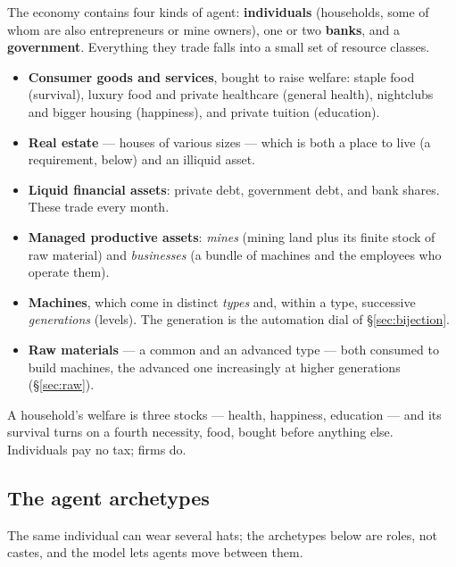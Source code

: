 \documentclass[11pt]{article}
\begin{document}
The economy contains four kinds of agent: \textbf{individuals} (households, some
of whom are also entrepreneurs or mine owners), one or two \textbf{banks}, and
a \textbf{government}. Everything they trade falls into a small set of
resource classes.

\begin{itemize}
  \item \textbf{Consumer goods and services}, bought to raise welfare: staple
  food (survival), luxury food and private healthcare (general health),
  nightclubs and bigger housing (happiness), and private tuition (education).
  \item \textbf{Real estate} --- houses of various sizes --- which is both a
  place to live (a requirement, below) and an illiquid asset.
  \item \textbf{Liquid financial assets}: private debt, government debt, and
  bank shares. These trade every month.
  \item \textbf{Managed productive assets}: \emph{mines} (mining land plus its
  finite stock of raw material) and \emph{businesses} (a bundle of machines and
  the employees who operate them).
  \item \textbf{Machines}, which come in distinct \emph{types} and, within a
  type, successive \emph{generations} (levels). The generation is the
  automation dial of \S\ref{sec:bijection}.
  \item \textbf{Raw materials} --- a common and an advanced type --- both
  consumed to build machines, the advanced one increasingly at higher
  generations (\S\ref{sec:raw}).
\end{itemize}

A household's welfare is three stocks --- health, happiness, education --- and
its survival turns on a fourth necessity, food, bought before anything else.
Individuals pay no tax; firms do.

\subsection{The agent archetypes}

The same individual can wear several hats; the archetypes below are roles, not
castes, and the model lets agents move between them.
\end{document}
